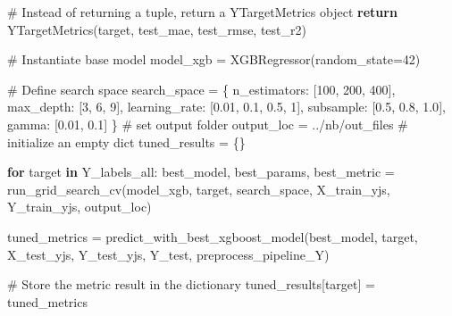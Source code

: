 \documentclass[
  letterpaper,
  DIV=11,
  numbers=noendperiod]{scrartcl}
\newenvironment{Shaded}{\begin{snugshade}}{\end{snugshade}}
\newcommand{\CommentTok}[1]{\textcolor[rgb]{0.37,0.37,0.37}{#1}}
\newcommand{\ControlFlowTok}[1]{\textcolor[rgb]{0.00,0.23,0.31}{\textbf{#1}}}
\newcommand{\DecValTok}[1]{\textcolor[rgb]{0.68,0.00,0.00}{#1}}
\newcommand{\FloatTok}[1]{\textcolor[rgb]{0.68,0.00,0.00}{#1}}
\newcommand{\KeywordTok}[1]{\textcolor[rgb]{0.00,0.23,0.31}{\textbf{#1}}}
\newcommand{\NormalTok}[1]{\textcolor[rgb]{0.00,0.23,0.31}{#1}}
\newcommand{\OperatorTok}[1]{\textcolor[rgb]{0.37,0.37,0.37}{#1}}
\newcommand{\StringTok}[1]{\textcolor[rgb]{0.13,0.47,0.30}{#1}}
\begin{document}
\begin{Shaded}
\begin{Highlighting}[]
    \CommentTok{\# Instead of returning a tuple, return a YTargetMetrics object}
    \ControlFlowTok{return}\NormalTok{ YTargetMetrics(target, test\_mae, test\_rmse, test\_r2)}
\end{Highlighting}
\end{Shaded}

\begin{Shaded}
\begin{Highlighting}[]
\CommentTok{\# Instantiate base model}
\NormalTok{model\_xgb }\OperatorTok{=}\NormalTok{ XGBRegressor(random\_state}\OperatorTok{=}\DecValTok{42}\NormalTok{)}

\CommentTok{\# Define search space}
\NormalTok{search\_space }\OperatorTok{=}\NormalTok{ \{}
    \StringTok{\textquotesingle{}n\_estimators\textquotesingle{}}\NormalTok{: [}\DecValTok{100}\NormalTok{, }\DecValTok{200}\NormalTok{, }\DecValTok{400}\NormalTok{],}
    \StringTok{\textquotesingle{}max\_depth\textquotesingle{}}\NormalTok{: [}\DecValTok{3}\NormalTok{, }\DecValTok{6}\NormalTok{, }\DecValTok{9}\NormalTok{],}
    \StringTok{\textquotesingle{}learning\_rate\textquotesingle{}}\NormalTok{: [}\FloatTok{0.01}\NormalTok{, }\FloatTok{0.1}\NormalTok{, }\FloatTok{0.5}\NormalTok{, }\DecValTok{1}\NormalTok{],}
    \StringTok{\textquotesingle{}subsample\textquotesingle{}}\NormalTok{: [}\FloatTok{0.5}\NormalTok{, }\FloatTok{0.8}\NormalTok{, }\FloatTok{1.0}\NormalTok{],}
    \StringTok{\textquotesingle{}gamma\textquotesingle{}}\NormalTok{: [}\FloatTok{0.01}\NormalTok{, }\FloatTok{0.1}\NormalTok{]}
\NormalTok{\}}
\CommentTok{\# set output folder}
\NormalTok{output\_loc }\OperatorTok{=} \StringTok{\textquotesingle{}../nb/out\_files\textquotesingle{}}
\CommentTok{\# initialize an empty dict}
\NormalTok{tuned\_results }\OperatorTok{=}\NormalTok{ \{\}}

\ControlFlowTok{for}\NormalTok{ target }\KeywordTok{in}\NormalTok{ Y\_labels\_all:}
\NormalTok{    best\_model, best\_params, best\_metric }\OperatorTok{=}\NormalTok{ run\_grid\_search\_cv(model\_xgb, target, search\_space, X\_train\_yjs, Y\_train\_yjs, output\_loc)}
    
\NormalTok{    tuned\_metrics }\OperatorTok{=}\NormalTok{ predict\_with\_best\_xgboost\_model(best\_model, target, X\_test\_yjs, Y\_test\_yjs, Y\_test, preprocess\_pipeline\_Y)}

    \CommentTok{\# Store the metric result in the dictionary}
\NormalTok{    tuned\_results[target] }\OperatorTok{=}\NormalTok{ tuned\_metrics}
\end{Highlighting}
\end{Shaded}
\end{document}
